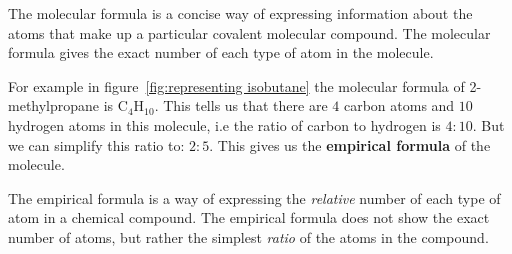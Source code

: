   {The molecular formula is a concise way of expressing information about the atoms that make up a particular covalent molecular compound. The molecular formula gives the exact number of each type of atom in the molecule. } 

For example in figure~\ref{fig:representing isobutane} the molecular formula of 2-methylpropane is $\text{C}_{4}\text{H}_{10}$. This tells us that there are $4$ carbon atoms and $10$ hydrogen atoms in this molecule, i.e the ratio of carbon to hydrogen is $4:10$. But we can simplify this ratio to: $2:5$. This gives us the \textbf{empirical formula} of the molecule. 

 { \label{m38120*meaningfhsst!!!underscore!!!id93}
The empirical formula is a way of expressing the \textsl{relative} number of each type of atom in a chemical compound. The empirical formula does not show the exact number of atoms, but rather the simplest \textsl{ratio} of the atoms in the compound. }


